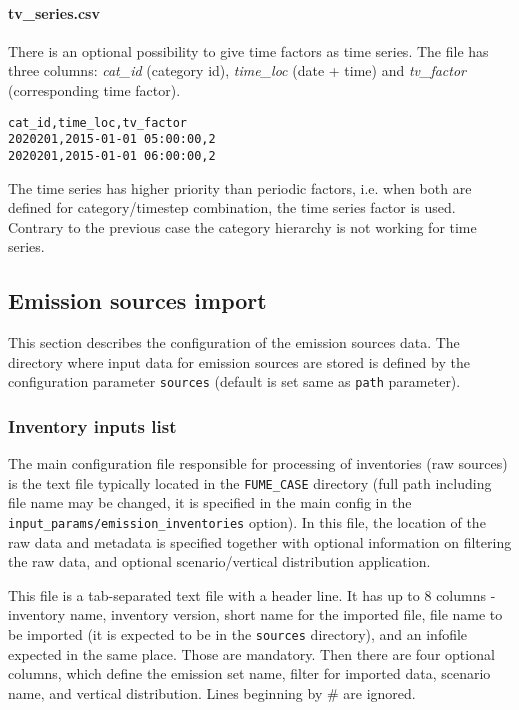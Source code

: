 \documentclass[a4paper,11pt]{article}
\begin{document}
\paragraph{tv\_series.csv} There is an optional possibility to give time factors as time series. The file has three columns: {\em cat\_id} (category id), {\em time\_loc} (date + time) and {\em tv\_factor} (corresponding time factor).
\begin{verbatim} 
cat_id,time_loc,tv_factor
2020201,2015-01-01 05:00:00,2
2020201,2015-01-01 06:00:00,2
\end{verbatim}
The time series has higher priority than periodic factors, i.e. when both are defined for category/timestep combination, the time series factor is used. Contrary to the previous case the category hierarchy is not working for time series.
 
\subsection{Emission sources import}\label{emiss-sources}
This section describes the configuration of the emission sources data. 
The directory where input data for emission sources are stored is defined by
the configuration parameter \verb|sources| (default is set same as \verb|path|
parameter). 

\subsubsection{Inventory inputs list}\label{inventory-inputs-list}
The main configuration file responsible for processing of inventories
(raw sources) is the text file typically located
in the \verb|FUME_CASE| directory (full path including file name may be
changed, it is specified in the main config in the
\verb|input_params/emission_inventories| option). In this file, the location of
the raw data and metadata is specified together with optional
information on filtering the raw data, and optional scenario/vertical distribution application.

This file is a tab-separated text file with a header line. It has up to 8 columns -
inventory name, inventory version, short name for the imported file, file
name to be imported (it is expected to be in the \verb|sources| directory), and an
infofile expected in the same place. Those are mandatory. Then there are four optional columns, which define the emission set name, filter for imported data, scenario name, and vertical distribution. Lines beginning by \# are ignored.
\end{document}
